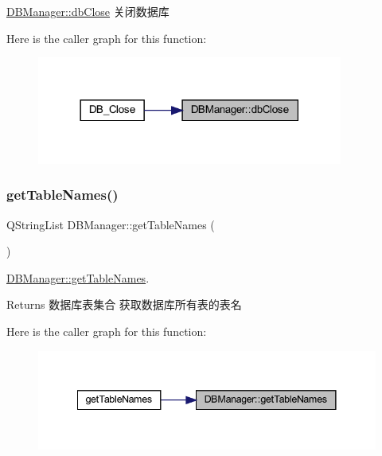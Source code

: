 \mbox{\hyperlink{class_d_b_manager_abe9b0e3d863e27668b62a7fa43227fa5}{D\+B\+Manager\+::db\+Close}} 关闭数据库 

Here is the caller graph for this function\+:
\nopagebreak
\begin{figure}[H]
\begin{center}
\leavevmode
\includegraphics[width=285pt]{class_d_b_manager_abe9b0e3d863e27668b62a7fa43227fa5_icgraph}
\end{center}
\end{figure}
\mbox{\label{class_d_b_manager_a9b85dcef0c0b6481b874982c2eff50b2}} 
\subsubsection{\texorpdfstring{getTableNames()}{getTableNames()}}
{\footnotesize\ttfamily Q\+String\+List D\+B\+Manager\+::get\+Table\+Names (\begin{DoxyParamCaption}{ }\end{DoxyParamCaption})}



\mbox{\hyperlink{class_d_b_manager_a9b85dcef0c0b6481b874982c2eff50b2}{D\+B\+Manager\+::get\+Table\+Names}}. 

\begin{DoxyReturn}{Returns}
数据库表集合 获取数据库所有表的表名 
\end{DoxyReturn}
Here is the caller graph for this function\+:
\nopagebreak
\begin{figure}[H]
\begin{center}
\leavevmode
\includegraphics[width=341pt]{class_d_b_manager_a9b85dcef0c0b6481b874982c2eff50b2_icgraph}
\end{center}
\end{figure}
\mbox{\label{class_d_b_manager_a95518b4ffbf5b26550b18c7f7d1e471f}} 
